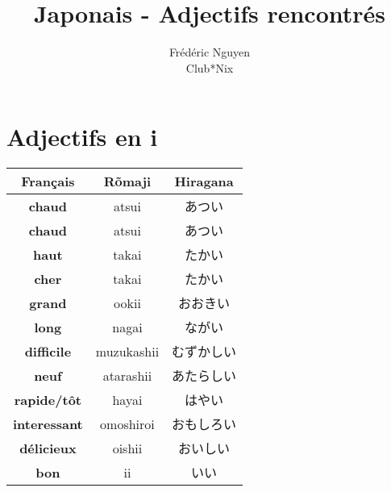 \documentclass[11pt]{report}
\title{Japonais - Adjectifs rencontrés}
\author{
	Frédéric Nguyen \\ Club*Nix
}
\newenvironment{Japanese}{%
\CJKfamily{min}%
\CJKtilde  
\CJKnospace}{}
\begin{document}
\maketitle
\tableofcontents

\chapter{Adjectifs en i}

\begin{CJK}{UTF8}{}  
\begin{Japanese}
	\begin{center}
		\begin{multicols}{2}
			\begin{tabular}{|c|c|c|}
				\hline
				\textbf{Français} & \textbf{Rõmaji} & \textbf{Hiragana} \\
				\hline
				\textbf{chaud} & atsui & あつい \\%
				\hline
				\textbf{chaud} & atsui & あつい \\%
				\hline
				\textbf{haut} & takai & たかい \\%
				\hline
				\textbf{cher} & takai & たかい \\%
				\hline
				\textbf{grand} & ookii & おおきい \\%
				\hline
				\textbf{long} & nagai & ながい \\%
				\hline
				\textbf{difficile} & muzukashii & むずかしい \\%
				\hline
				\textbf{neuf} & atarashii & あたらしい \\%
				\hline
				\textbf{rapide/t\^ot} & hayai & はやい \\%
				\hline
				\textbf{interessant} & omoshiroi & おもしろい \\%
				\hline
				\textbf{délicieux} & oishii & おいしい \\%
				\hline
				\textbf{bon} & ii & いい \\%
				\hline


\end{tabular}
\end{multicols}
\end{center}
\end{Japanese}
\end{CJK}
\end{document}
